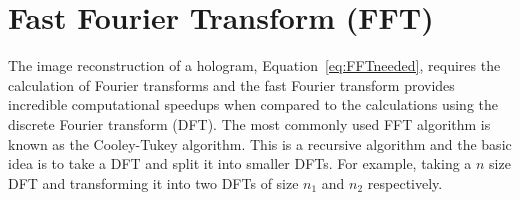 %
%
%
%
%
%
%
%

    \section{Fast Fourier Transform (FFT) \label{sect:FFT}}

    The image reconstruction of a hologram, Equation~\ref{eq:FFTneeded},
    requires the calculation of Fourier transforms and the fast Fourier
    transform provides incredible computational speedups when compared to the
    calculations using the discrete Fourier transform (DFT).
%
%
        The most commonly used FFT algorithm is known as the Cooley-Tukey algorithm.
        This is a recursive algorithm and the basic idea is to take a DFT and split it
        into smaller DFTs. For example, taking a $n$ size DFT and transforming it into
        two DFTs of size $n_1$ and $n_2$ respectively.


